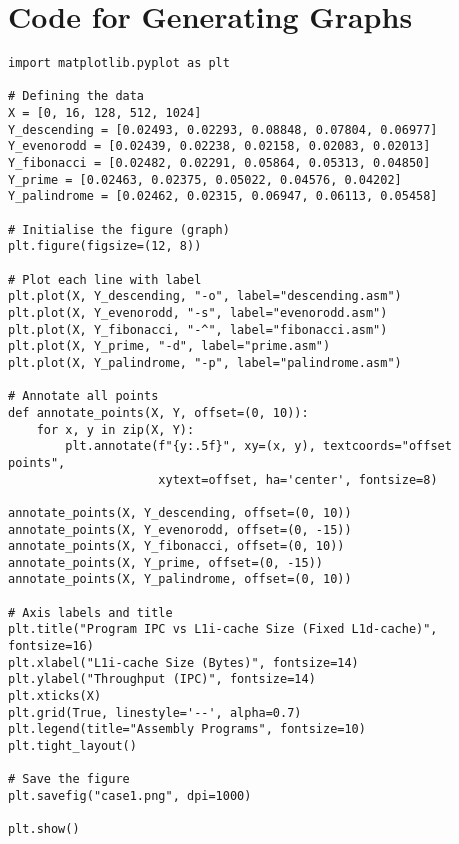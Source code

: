 \documentclass{article}
\begin{document}
\section{Code for Generating Graphs}
\begin{lstlisting}[caption={Code for graph for varying l1i-cache (l1d-constant}]
import matplotlib.pyplot as plt

# Defining the data
X = [0, 16, 128, 512, 1024]
Y_descending = [0.02493, 0.02293, 0.08848, 0.07804, 0.06977]
Y_evenorodd = [0.02439, 0.02238, 0.02158, 0.02083, 0.02013]
Y_fibonacci = [0.02482, 0.02291, 0.05864, 0.05313, 0.04850]
Y_prime = [0.02463, 0.02375, 0.05022, 0.04576, 0.04202]
Y_palindrome = [0.02462, 0.02315, 0.06947, 0.06113, 0.05458]

# Initialise the figure (graph)
plt.figure(figsize=(12, 8))

# Plot each line with label
plt.plot(X, Y_descending, "-o", label="descending.asm")
plt.plot(X, Y_evenorodd, "-s", label="evenorodd.asm")
plt.plot(X, Y_fibonacci, "-^", label="fibonacci.asm")
plt.plot(X, Y_prime, "-d", label="prime.asm")
plt.plot(X, Y_palindrome, "-p", label="palindrome.asm")

# Annotate all points
def annotate_points(X, Y, offset=(0, 10)):
    for x, y in zip(X, Y):
        plt.annotate(f"{y:.5f}", xy=(x, y), textcoords="offset points",
                     xytext=offset, ha='center', fontsize=8)

annotate_points(X, Y_descending, offset=(0, 10))
annotate_points(X, Y_evenorodd, offset=(0, -15))
annotate_points(X, Y_fibonacci, offset=(0, 10))
annotate_points(X, Y_prime, offset=(0, -15))
annotate_points(X, Y_palindrome, offset=(0, 10))

# Axis labels and title
plt.title("Program IPC vs L1i-cache Size (Fixed L1d-cache)", fontsize=16)
plt.xlabel("L1i-cache Size (Bytes)", fontsize=14)
plt.ylabel("Throughput (IPC)", fontsize=14)
plt.xticks(X)
plt.grid(True, linestyle='--', alpha=0.7)
plt.legend(title="Assembly Programs", fontsize=10)
plt.tight_layout()

# Save the figure
plt.savefig("case1.png", dpi=1000)

plt.show()

\end{lstlisting}
\end{document}
